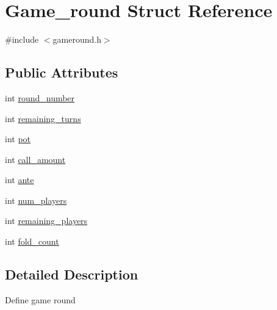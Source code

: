 \hypertarget{structGame__round}{\section{Game\+\_\+round Struct Reference}
\label{structGame__round}
}


{\ttfamily \#include $<$gameround.\+h$>$}

\subsection*{Public Attributes}
\begin{DoxyCompactItemize}
\item 
int \hyperlink{structGame__round_adab8aba7da87ebc3ccf673e7a6e225db}{round\+\_\+number}
\item 
int \hyperlink{structGame__round_a40236e950983508542529a1e5bba790b}{remaining\+\_\+turns}
\item 
int \hyperlink{structGame__round_a78ef2676dde6281e79deb854970217e3}{pot}
\item 
int \hyperlink{structGame__round_abc13ce196b64a82d21cb90cf9f32c6aa}{call\+\_\+amount}
\item 
int \hyperlink{structGame__round_ae714f80e2818785c32f96a65385f52ff}{ante}
\item 
int \hyperlink{structGame__round_ad4d30404f990b156abfaa4ad33987b21}{num\+\_\+players}
\item 
int \hyperlink{structGame__round_a11790ed09816dd873ec0dd4af2975069}{remaining\+\_\+players}
\item 
int \hyperlink{structGame__round_a611e1e50b9e40e7662777fbb81476f96}{fold\+\_\+count}
\end{DoxyCompactItemize}


\subsection{Detailed Description}
Define game round 

